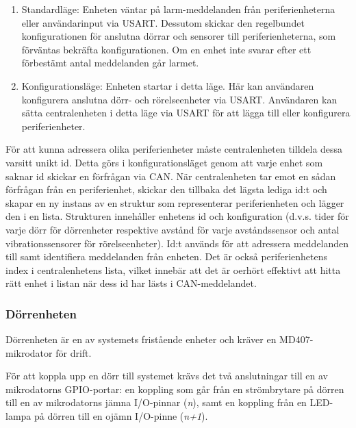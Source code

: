 \documentclass{article}
\begin{document}
\begin{enumerate}
    \item Standardläge: Enheten väntar på larm-meddelanden från periferienheterna eller användarinput via USART. Dessutom skickar den regelbundet  konfigurationen för anslutna dörrar och sensorer till periferienheterna, som förväntas bekräfta konfigurationen. Om en enhet inte svarar efter ett förbestämt antal meddelanden går larmet.
    \item Konfigurationsläge: Enheten startar i detta läge.
     Här kan användaren konfigurera anslutna dörr- och
 rörelseenheter via USART. Användaren kan sätta centralenheten
      i detta läge via USART för att lägga till eller konfigurera periferienheter.
\end{enumerate}

För att kunna adressera olika periferienheter måste centralenheten tilldela dessa varsitt unikt id. Detta görs i konfigurationsläget genom att varje enhet som saknar id skickar en förfrågan via CAN. När centralenheten tar emot en sådan förfrågan från en periferienhet, skickar den tillbaka det lägsta lediga id:t och skapar en ny instans av en struktur som representerar periferienheten och lägger den i en lista. Strukturen innehåller enhetens id och konfiguration (d.v.s. tider för varje dörr för dörrenheter respektive avstånd för varje avståndssensor och antal vibrationssensorer för rörelseenheter).
Id:t används för att adressera meddelanden till samt identifiera meddelanden från enheten. Det är också periferienhetens index i centralenhetens lista, vilket innebär att det är oerhört effektivt att hitta rätt enhet i listan när dess id har lästs i CAN-meddelandet.





\subsubsection{Dörrenheten}
\label{subsec:Dörrenheten}

Dörrenheten är en av systemets fristående enheter och kräver en MD407-mikrodator för drift.

För att koppla upp en dörr till systemet krävs det två anslutningar till en av mikrodatorns
 GPIO-portar: en koppling som går från en strömbrytare på dörren till en av mikrodatorns jämna
  I/O-pinnar (\textit{n}), samt en koppling från en LED-lampa på dörren till en ojämn I/O-pinne (\textit{n+1}).
\end{document}
